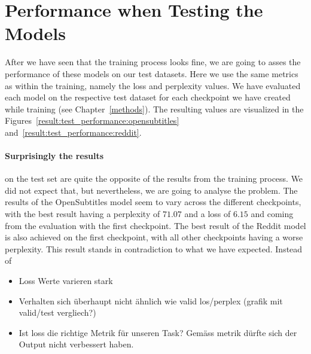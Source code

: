 \section{Performance when Testing the Models}
After we have seen that the training process looks fine, we are going to asses the performance of these models on our test datasets. Here we use the same metrics as within the training, namely the loss and perplexity values. We have evaluated each model on the respective test dataset for each checkpoint we have created while training (see Chapter~\ref{methods}). The resulting values are visualized in the Figures~\ref{result:test_performance:opensubtitles} and~\ref{result:test_performance:reddit}.

\paragraph{Surprisingly the results} on the test set are quite the opposite of the results from the training process. We did not expect that, but nevertheless, we are going to analyse the problem.
The results of the OpenSubtitles model seem to vary across the different checkpoints, with the best result having a perplexity of $71.07$ and a loss of $6.15$ and coming from the evaluation with the first checkpoint. The best result of the Reddit model is also achieved on the first checkpoint, with all other checkpoints having a worse perplexity.
This result stands in contradiction to what we have expected. Instead of 
\begin{itemize}
	\item Loss Werte varieren stark
	\item Verhalten sich überhaupt nicht ähnlich wie valid los/perplex (grafik mit valid/test vergliech?) 
	\item Ist loss die richtige Metrik für unseren Task? Gemäss metrik dürfte sich der Output nicht verbessert haben.
\end{itemize}

